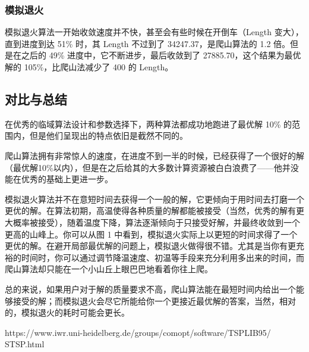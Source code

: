 \subsubsection{模拟退火}

模拟退火算法一开始收敛速度并不快，甚至会有些时候在开倒车（Length 变大），直到进度到达 51\% 时，其 Length 不过到了 34247.37，是爬山算法的 1.2 倍。但是在之后的 49\% 进度中，它不断进步，最后收敛到了 27885.70，这个结果为最优解的 105\%，比爬山法减少了 400 的 Length。

\subsection{对比与总结}

在优秀的临域算法设计和参数选择下，两种算法都成功地跑进了最优解 10\% 的范围内，但是他们呈现出的特点依旧是截然不同的。

爬山算法拥有非常惊人的速度，在进度不到一半的时候，已经获得了一个很好的解（最优解10\%以内），但是在之后给其的大多数计算资源被白白浪费了——他并没能在优秀的基础上更进一步。

模拟退火算法并不在意短时间去获得一个一般的解，它更倾向于用时间去打磨一个更优的解。在算法初期，高温使得各种质量的解都能被接受（当然，优秀的解有更大概率被接受），随着温度下降，算法逐渐倾向于只接受好解，并最终收敛到一个更高的山峰上。你可以从图 1 中看到，模拟退火实际上以更短的时间求得了一个更优的解。在避开局部最优解的问题上，模拟退火做得很不错。尤其是当你有更充裕的时间时，你可以通过调节降温速度、初温等手段来充分利用多出来的时间，而爬山算法却只能在一个小山丘上眼巴巴地看着你往上爬。

总的来说，如果用户对于解的质量要求不高，爬山算法能在最短时间内给出一个能够接受的解；而模拟退火会尽它所能给你一个更接近最优解的答案，当然，相对的，模拟退火的耗时可能会更长。

\begin{thebibliography}{}
 https://www.iwr.uni-heidelberg.de/groups/comopt/software/TSPLIB95/
STSP.html
\end{thebibliography}

